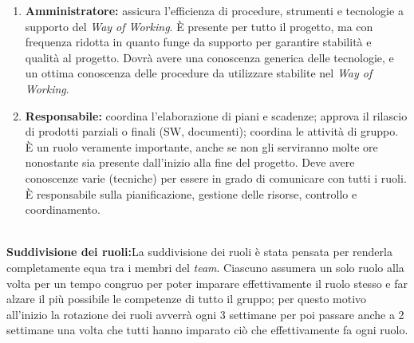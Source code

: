 \begin{enumerate}
\item \textbf{Amministratore:} assicura l'efficienza di procedure, strumenti e tecnologie a supporto del 
\textit{Way of Working}.
È presente per tutto il progetto, ma con frequenza ridotta in quanto funge da supporto per garantire 
stabilità e qualità al progetto. Dovrà avere una conoscenza generica delle tecnologie, e un ottima 
conoscenza delle procedure da utilizzare stabilite nel \textit{Way of Working}.

\item \textbf{Responsabile:} coordina l'elaborazione di piani e scadenze; approva il rilascio di prodotti 
parziali o finali (SW, documenti); coordina le attività di gruppo.
È un ruolo veramente importante, anche se non gli serviranno molte ore nonostante sia presente dall'inizio 
alla fine del progetto.
Deve avere conoscenze varie (tecniche) per essere in grado di comunicare con tutti i ruoli.
È responsabile sulla pianificazione, gestione delle risorse, controllo e coordinamento. 
\end{enumerate}



\textbf{\\Suddivisione dei ruoli:}La suddivisione dei ruoli è stata pensata per renderla completamente equa tra i membri del \textit{team}.
Ciascuno assumera un solo ruolo alla volta per un tempo congruo per poter imparare effettivamente il ruolo stesso 
e far alzare il più possibile le competenze di tutto il gruppo; 
per questo motivo all'inizio la rotazione dei ruoli avverrà ogni 3 settimane per poi passare anche a 2 settimane 
una volta che tutti hanno imparato ciò che effettivamente fa ogni ruolo.